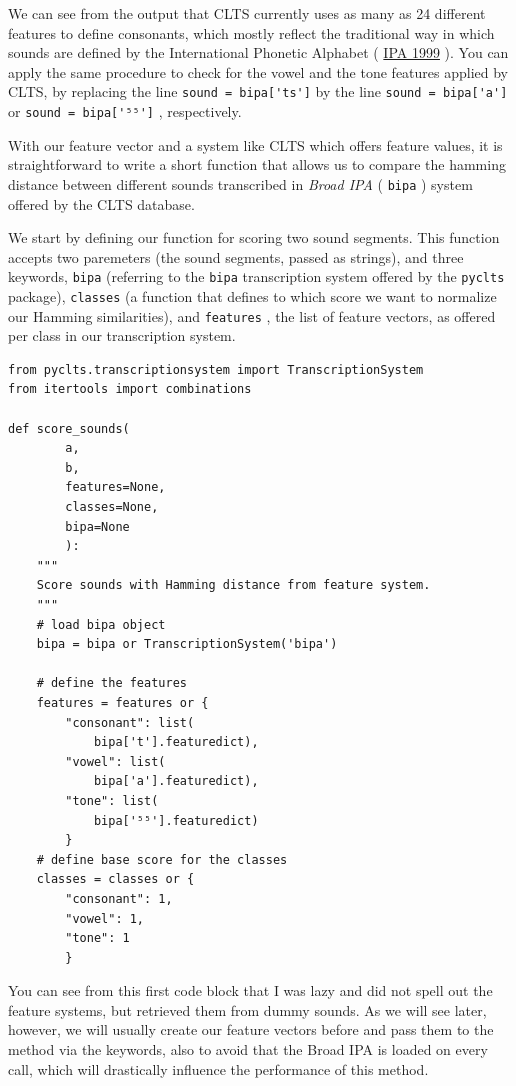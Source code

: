 \documentclass[
  a4paper,
  14pt,
  oneside,
  tablecaptionabove
]{scrbook}
\newcommand{\passthrough}[1]{#1}
\begin{document}
We can see from the output that CLTS currently uses as many as 24
different features to define consonants, which mostly reflect the
traditional way in which sounds are defined by the International
Phonetic Alphabet (
\href{http://bibliography.lingpy.org?key=IPA1999}{IPA 1999} ). You can
apply the same procedure to check for the vowel and the tone features
applied by CLTS, by replacing the line
\lstinline!sound = bipa['ts']! by the line
\lstinline!sound = bipa['a']! or
\lstinline!sound = bipa['⁵⁵']! , respectively.

With our feature vector and a system like CLTS which offers feature
values, it is straightforward to write a short function that allows us
to compare the hamming distance between different sounds transcribed in
\emph{Broad IPA} ( \passthrough{\lstinline!bipa!} ) system offered by
the CLTS database.

We start by defining our function for scoring two sound segments. This
function accepts two paremeters (the sound segments, passed as strings),
and three keywords, \passthrough{\lstinline!bipa!} (referring to the
\passthrough{\lstinline!bipa!} transcription system offered by the
\passthrough{\lstinline!pyclts!} package),
\passthrough{\lstinline!classes!} (a function that defines to which
score we want to normalize our Hamming similarities), and
\passthrough{\lstinline!features!} , the list of feature vectors, as
offered per class in our transcription system.

\begin{lstlisting}
from pyclts.transcriptionsystem import TranscriptionSystem
from itertools import combinations

def score_sounds(
        a,
        b,
        features=None,
        classes=None,
        bipa=None
        ):
    """
    Score sounds with Hamming distance from feature system.
    """
    # load bipa object
    bipa = bipa or TranscriptionSystem('bipa')

    # define the features
    features = features or {
        "consonant": list(
            bipa['t'].featuredict),
        "vowel": list(
            bipa['a'].featuredict),
        "tone": list(
            bipa['⁵⁵'].featuredict)
        }
    # define base score for the classes
    classes = classes or {
        "consonant": 1,
        "vowel": 1,
        "tone": 1
        }
\end{lstlisting}

You can see from this first code block that I was lazy and did not spell
out the feature systems, but retrieved them from dummy sounds. As we
will see later, however, we will usually create our feature vectors
before and pass them to the method via the keywords, also to avoid that
the Broad IPA is loaded on every call, which will drastically influence
the performance of this method.
\end{document}
